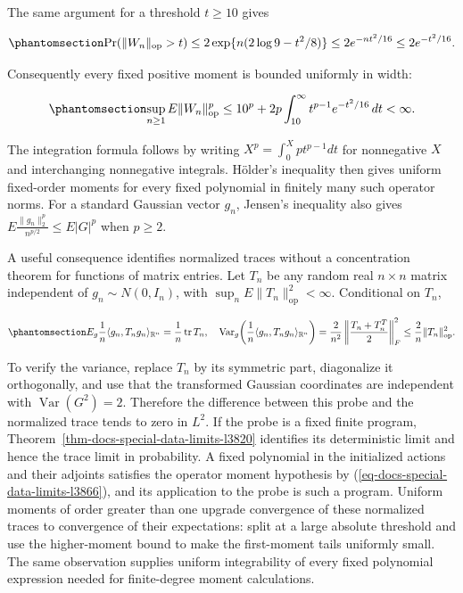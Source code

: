 \documentclass[
  11pt,
]{article}
\theoremstyle{definition}
\theoremstyle{plain}
\theoremstyle{plain}
\theoremstyle{plain}
\theoremstyle{remark}
\begin{document}
The same argument for a threshold \(t\ge10\) gives

\begin{equation}\protect\phantomsection\label{eq-docs-special-data-limits-l3859}{
\Pr(\|W_n\|_{\mathrm{op}}>t)
\le2\exp\{n(2\log9-t^2/8)\}
\le2e^{-nt^2/16}\le2e^{-t^2/16}.
}\end{equation}

Consequently every fixed positive moment is bounded uniformly in width:

\begin{equation}\protect\phantomsection\label{eq-docs-special-data-limits-l3866}{
\sup_{n\ge1}E\|W_n\|_{\mathrm{op}}^p
\le10^p+2p\int_{10}^\infty t^{p-1}e^{-t^2/16}\,dt<\infty.
}\end{equation}

The integration formula follows by writing \(X^p=\int_0^Xpt^{p-1}dt\)
for nonnegative \(X\) and interchanging nonnegative integrals. Hölder's
inequality then gives uniform fixed-order moments for every fixed
polynomial in finitely many such operator norms. For a standard Gaussian
vector \(g_n\), Jensen's inequality also gives
\(E\frac{\|g_n\|_2^p}{n^{p/2}}\le E|G|^p\) when \(p\ge2\).

A useful consequence identifies normalized traces without a
concentration theorem for functions of matrix entries. Let \(T_n\) be
any random real \(n\times n\) matrix independent of
\(g_n\sim N(0,I_n)\), with \(\sup_nE\|T_n\|_{\mathrm{op}}^2<\infty\).
Conditional on \(T_n\),

\begin{equation}\protect\phantomsection\label{eq-docs-special-data-limits-l3874}{
E_g\frac{1}{n}\langle g_n,T_ng_n\rangle_{\mathbb R^n}=\frac1n\operatorname{tr}T_n,
\quad
\operatorname{Var}_g\!\left(\frac{1}{n}\langle g_n,T_ng_n\rangle_{\mathbb R^n}\right)
=\frac{2}{n^2}\left\|\frac{T_n+T_n^T}{2}\right\|_F^2
\le\frac{2}{n}\|T_n\|_{\mathrm{op}}^2.
}\end{equation}

To verify the variance, replace \(T_n\) by its symmetric part,
diagonalize it orthogonally, and use that the transformed Gaussian
coordinates are independent with \(\operatorname{Var}(G^2)=2\).
Therefore the difference between this probe and the normalized trace
tends to zero in \(L^2\). If the probe is a fixed finite program,
Theorem~\ref{thm-docs-special-data-limits-l3820} identifies its
deterministic limit and hence the trace limit in probability. A fixed
polynomial in the initialized actions and their adjoints satisfies the
operator moment hypothesis by (\ref{eq-docs-special-data-limits-l3866}),
and its application to the probe is such a program. Uniform moments of
order greater than one upgrade convergence of these normalized traces to
convergence of their expectations: split at a large absolute threshold
and use the higher-moment bound to make the first-moment tails uniformly
small. The same observation supplies uniform integrability of every
fixed polynomial expression needed for finite-degree moment
calculations.
\end{document}
